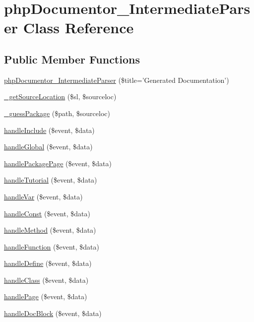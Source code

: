 \hypertarget{classphp_documentor___intermediate_parser}{\section{php\-Documentor\-\_\-\-Intermediate\-Parser \-Class \-Reference}
\label{classphp_documentor___intermediate_parser}
}
\subsection*{\-Public \-Member \-Functions}
\begin{DoxyCompactItemize}
\item 
\hyperlink{classphp_documentor___intermediate_parser_a75d4ab0a0ad45aec5e8badd106d0712a}{php\-Documentor\-\_\-\-Intermediate\-Parser} (\$title='\-Generated \-Documentation')
\item 
\hyperlink{classphp_documentor___intermediate_parser_ae91408e671f961dfc5833e51298fd981}{\-\_\-get\-Source\-Location} (\$sl, \$sourceloc)
\item 
\hyperlink{classphp_documentor___intermediate_parser_a64426cb208ea4666580ae32e889e5363}{\-\_\-guess\-Package} (\$path, \$sourceloc)
\item 
\hyperlink{classphp_documentor___intermediate_parser_a7d72c4075fba0eecb4419d0b25db3b1e}{handle\-Include} (\$event, \$data)
\item 
\hyperlink{classphp_documentor___intermediate_parser_ad0d088b5257089f9eda67af32ff89161}{handle\-Global} (\$event, \$data)
\item 
\hyperlink{classphp_documentor___intermediate_parser_a6774b93c9e6e887a177ac596f3fcdfae}{handle\-Package\-Page} (\$event, \$data)
\item 
\hyperlink{classphp_documentor___intermediate_parser_a7467009370c6e6274f666aa329d729bc}{handle\-Tutorial} (\$event, \$data)
\item 
\hyperlink{classphp_documentor___intermediate_parser_a43880024224e56cbe4951bc3f7128129}{handle\-Var} (\$event, \$data)
\item 
\hyperlink{classphp_documentor___intermediate_parser_af32d820db1a8a2c30aa35de8dc80db28}{handle\-Const} (\$event, \$data)
\item 
\hyperlink{classphp_documentor___intermediate_parser_a30ce3810771b4b88663ecd22fee1a2ad}{handle\-Method} (\$event, \$data)
\item 
\hyperlink{classphp_documentor___intermediate_parser_aa259ad80c83f18ef8ba951ad372a622d}{handle\-Function} (\$event, \$data)
\item 
\hyperlink{classphp_documentor___intermediate_parser_a48c4c3f8328e1a71a932f9c0a7b08db6}{handle\-Define} (\$event, \$data)
\item 
\hyperlink{classphp_documentor___intermediate_parser_a80452a620933e1cdf5e66a92bbbaa743}{handle\-Class} (\$event, \$data)
\item 
\hyperlink{classphp_documentor___intermediate_parser_a542acce45784b22cc6a875d6e4aae602}{handle\-Page} (\$event, \$data)
\item 
\hyperlink{classphp_documentor___intermediate_parser_ac67ef1d2950219672764fa969c3ed1bd}{handle\-Doc\-Block} (\$event, \$data)
\end{DoxyCompactItemize}
